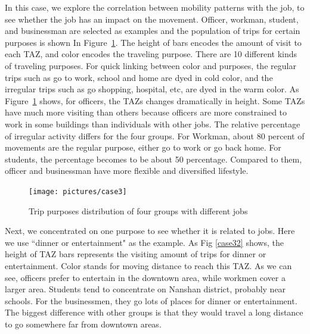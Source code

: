 
In this case, we explore the correlation between mobility patterns with the job, to see whether the job has an impact on the movement. Officer, workman, student, and businessman are selected as examples and the population of trips for certain purposes is shown In Figure~\ref{case3}. The height of bars encodes the amount of visit to each TAZ, and color encodes the traveling purpose. There are 10 different kinds of traveling purposes. For quick linking between color and purposes, the regular trips such as go to work, school and home are dyed in cold color, and the irregular trips such as go shopping, hospital, etc, are dyed in the warm color. As Figure~\ref{case3} shows, for officers, the TAZs changes dramatically in height. Some TAZs have much more visiting than others because officers are more constrained to work in some buildings than individuals with other jobs. The relative percentage of irregular activity differs for the four groups. For Workman, about 80 percent of movements are the regular purpose, either go to work or go back home. For students, the percentage becomes to be about 50 percentage. Compared to them, officer and businessman have more flexible and diversified lifestyle.

\begin{figure}[htb!]
 \centering %
 \texttt{[image: pictures/case3]}
 \caption{Trip purposes distribution of four groups with different jobs}
 \label{case3}
\end{figure}

Next, we concentrated on one purpose to see whether it is related to jobs. Here we use ``dinner or entertainment" as the example. As Fig \ref{case32} shows, the height of TAZ bars represents the visiting amount of trips for dinner or entertainment. Color stands for moving distance to reach this TAZ. As we can see, officers prefer to entertain in the downtown area, while workmen cover a larger area. Students tend to concentrate on Nanshan district, probably near schools. For the businessmen, they go lots of places for dinner or entertainment. The biggest difference with other groups is that they would travel a long distance to go somewhere far from downtown areas.

